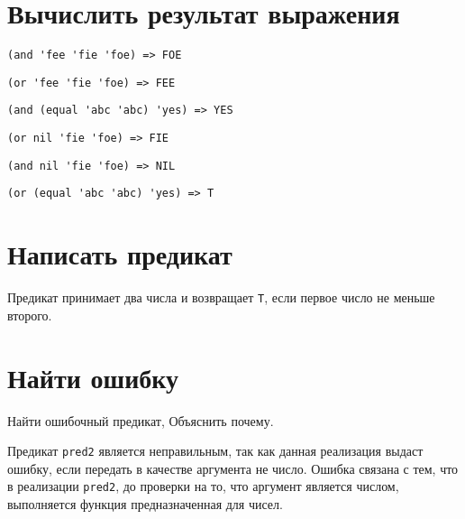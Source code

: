 \section{Вычислить результат выражения}

\problem \hfill
\begin{lstlisting}
(and 'fee 'fie 'foe) => FOE
\end{lstlisting}


\problem \hfill
\begin{lstlisting}
(or 'fee 'fie 'foe) => FEE
\end{lstlisting}


\problem \hfill
\begin{lstlisting}
(and (equal 'abc 'abc) 'yes) => YES
\end{lstlisting}


\problem \hfill
\begin{lstlisting}
(or nil 'fie 'foe) => FIE
\end{lstlisting}


\problem \hfill
\begin{lstlisting}
(and nil 'fie 'foe) => NIL
\end{lstlisting}


\problem \hfill
\begin{lstlisting}
(or (equal 'abc 'abc) 'yes) => T
\end{lstlisting}



\section{Написать предикат}

\problem
Предикат принимает два числа и возвращает \verb|T|, если первое число не меньше второго.




\section{Найти ошибку}

\problem Найти ошибочный предикат, Объяснить почему.


\noindent
Предикат \verb|pred2| является неправильным, так как данная реализация выдаст ошибку, если передать в качестве аргумента не число. Ошибка связана с тем, что в реализации \verb|pred2|, до проверки на то, что аргумент является числом, выполняется функция предназначенная для чисел.



